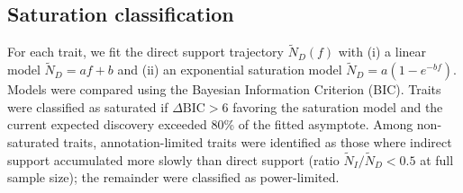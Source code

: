 \subsection{Saturation classification}
For each trait, we fit the direct support trajectory $\tilde{N}_D(f)$ with (i) a linear model $\tilde{N}_D = af + b$ and (ii) an exponential saturation model $\tilde{N}_D = a(1 - e^{-bf})$. Models were compared using the Bayesian Information Criterion (BIC). Traits were classified as saturated if $\Delta\text{BIC} > 6$ favoring the saturation model and the current expected discovery exceeded 80\% of the fitted asymptote. Among non-saturated traits, annotation-limited traits were identified as those where indirect support accumulated more slowly than direct support (ratio $\tilde{N}_I / \tilde{N}_D < 0.5$ at full sample size); the remainder were classified as power-limited.


